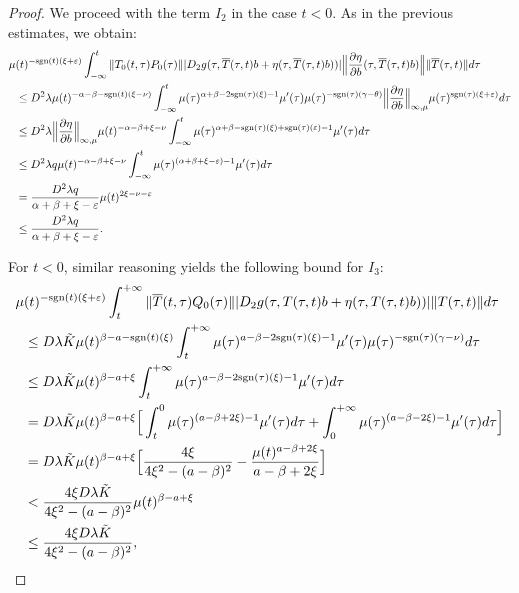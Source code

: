 \documentclass[9pt]{amsart}
\numberwithin{equation}{section}
\numberwithin{lemma}{section}
\begin{document}
\begin{proof}
We proceed with the term \(I_2\) in the case \(t < 0\). As in the previous estimates, we obtain:
\begin{equation*}
    \begin{split}
        \mu&(t)^{-\textnormal{sgn}(t)(\xi+\varepsilon)}\int_{-\infty}^{t}\|T_0(t,\tau)P_0(\tau)\| |D_2g(\tau, \overline{T}(\tau,t)b+\eta(\tau,\overline{T}(\tau,t)b))| \Big\|\frac{\partial\eta}{\partial b}(\tau,\overline{T}(\tau,t)b)\Big\|\|\overline{T}(\tau,t)\|d\tau\\
        &\leq D^2\lambda\mu(t)^{-\alpha-\beta-\textnormal{sgn}(t)(\xi-\nu)}\int_{-\infty}^{t}\mu(\tau)^{\alpha+\beta-2\textnormal{sgn}(\tau)(\xi)-1}\mu'(\tau)\mu(\tau)^{-\textnormal{sgn}(\tau)(\gamma-\theta)}\Big\|\frac{\partial\eta}{\partial b}\Big\|_{\infty,\mu}\mu(\tau)^{\textnormal{sgn}(\tau)(\xi+\varepsilon)}d\tau\\
        &\leq  D^2\lambda\Big\|\frac{\partial\eta}{\partial b}\Big\|_{\infty,\mu}\mu(t)^{-\alpha-\beta+\xi-\nu}\int_{-\infty}^{t}\mu(\tau)^{\alpha+\beta-\textnormal{sgn}(\tau)(\xi)+\textnormal{sgn}(\tau)(\varepsilon)-1}\mu'(\tau)d\tau\\
        &\leq D^2\lambda q \mu(t)^{-\alpha-\beta+\xi-\nu} \int_{-\infty}^{t}\mu(\tau)^{(\alpha+\beta+\xi-\varepsilon)-1}\mu'(\tau)d\tau\\
        &= \frac{D^2\lambda q}{\alpha+\beta+\xi-\varepsilon}\mu(t)^{2\xi-\nu-\varepsilon}\\
        &\leq \frac{D^2\lambda q}{\alpha+\beta+\xi-\varepsilon}.
    \end{split}
\end{equation*}

For \(t < 0\), similar reasoning yields the following bound for \(I_3\):
\begin{equation*}
    \begin{split}
        \mu&(t)^{-\textnormal{sgn}(t)(\xi+\varepsilon)}\int_{t}^{+\infty}\|\overline{T}(t,\tau)Q_0(\tau)\| |D_2g(\tau,T(\tau,t)b+\eta(\tau,T(\tau,t)b))| \|T(\tau,t)\|d\tau\\
        &\leq D\lambda\tilde{K}\mu(t)^{\beta-a-\textnormal{sgn}(t)(\xi)}\int_{t}^{+\infty}\mu(\tau)^{a-\beta-2\textnormal{sgn}(\tau)(\xi)-1}\mu'(\tau)\mu(\tau)^{-\textnormal{sgn}(\tau)(\gamma-\nu)}d\tau\\
        &\leq D\lambda\tilde{K}\mu(t)^{\beta-a+\xi}\int_{t}^{+\infty}\mu(\tau)^{a-\beta-2\textnormal{sgn}(\tau)(\xi)-1}\mu'(\tau)d\tau\\
        &= D\lambda\tilde{K}\mu(t)^{\beta-a+\xi}\Big[\int_{t}^{0}\mu(\tau)^{(a-\beta+2\xi)-1}\mu'(\tau)d\tau + \int_{0}^{+\infty}\mu(\tau)^{(a-\beta-2\xi)-1}\mu'(\tau)d\tau\Big]\\
        &= D\lambda\tilde{K}\mu(t)^{\beta-a+\xi}\Big[\frac{4\xi}{4\xi^2-(a-\beta)^2}-\frac{\mu(t)^{a-\beta+2\xi}}{a-\beta+2\xi}\Big]\\
        &< \frac{4\xi D\lambda\tilde{K}}{4\xi^2-(a-\beta)^2}\mu(t)^{\beta-a+\xi}\\
        &\leq \frac{4\xi D\lambda\tilde{K}}{4\xi^2-(a-\beta)^2},
    \end{split}
\end{equation*}


\end{proof}
\end{document}
